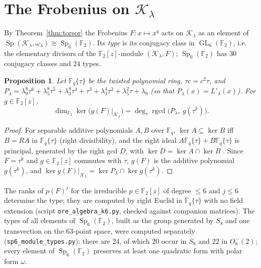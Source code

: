\documentclass[12pt,a4paper]{amsart}
\newtheorem{proposition}[theorem]{Proposition}
\theoremstyle{definition}
\newcommand{\F}{\mathbb{F}}
\newcommand{\Sp}{\operatorname{Sp}}
\newcommand{\GL}{\operatorname{GL}}
\newcommand{\Kk}{\mathcal{K}}
\newcommand{\Fq}{\F_{q}}
\begin{document}
\section{The Frobenius on \texorpdfstring{$\Kk_\lambda$}{K}}\label{sec:frob}

By Theorem~\ref{thm:torsor} the Frobenius $F:x\mapsto x^q$ acts on $\Kk_\lambda$ as an element of $\Sp(\Kk_\lambda,\omega_\lambda)\cong\Sp_6(\F_2)$. Its \emph{type} is its conjugacy class in $\GL_6(\F_2)$, i.e. the elementary divisors of the $\F_2[z]$-module $(\Kk_\lambda,F)$; $\Sp_6(\F_2)$ has $30$ conjugacy classes \cite{Atlas} and $24$ types.

\begin{proposition}\label{prop:ore}
Let $\Fq\{\tau\}$ be the twisted polynomial ring, $\tau c=c^2\tau$, and $P_\lambda=\lambda_9^8\tau^6+\lambda_5^8\tau^5+\lambda_3^8\tau^4+\tau^3+\lambda_3^4\tau^2+\lambda_5^2\tau+\lambda_9$ \textup{(}so that $P_\lambda(x)=L'_\lambda(x)$\textup{)}. For $g\in\F_2[z]$,
\[
\dim_{\F_2}\ker\bigl(g(F)|_{\Kk_\lambda}\bigr)=\deg_\tau\operatorname{rgcd}\bigl(P_\lambda,\ g(\tau^k)\bigr).
\]
\end{proposition}
\begin{proof}
For separable additive polynomials $A,B$ over $\Fq$, $\ker A\subseteq\ker B$ iff $B=RA$ in $\Fq\{\tau\}$ (right divisibility), and the right ideal $A\Fq\{\tau\}+B\Fq\{\tau\}$ is principal, generated by the right gcd $D$, with $\ker D=\ker A\cap\ker B$ \cite{Ore,LN}. Since $F=\tau^k$ and $g\in\F_2[z]$ commutes with $\tau$, $g(F)$ is the additive polynomial $g(\tau^k)$, and $\ker g(F)|_{\Kk_\lambda}=\ker P_\lambda\cap\ker g(\tau^k)$.
\end{proof}

The ranks of $p(F)^j$ for the irreducible $p\in\F_2[z]$ of degree $\le6$ and $j\le6$ determine the type; they are computed by right Euclid in $\Fq\{\tau\}$ with no field extension (script \texttt{ore\_algebra\_k6.py}, checked against companion matrices). The types of all elements of $\Sp_6(\F_2)$, built as the group generated by $S_8$ and one transvection on the $63$-point space, were computed separately (\texttt{sp6\_module\_types.py}): there are $24$, of which $20$ occur in $S_8$ and $22$ in $O_6^-(2)$; every element of $\Sp_6(\F_2)$ preserves at least one quadratic form with polar form $\omega$.
\end{document}
